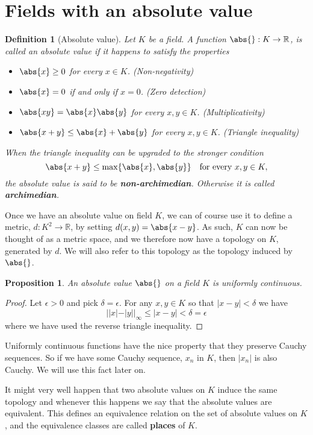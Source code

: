 \documentclass{article}
\newtheorem{definition}{Definition}[section]
\newtheorem{proposition}{Proposition}[section]
\newcommand{\mbb}[1]{\mathbb{#1}}
\begin{document}
\section{Fields with an absolute value}

\begin{definition}[Absolute value]
    Let $K$ be a field. A function $\abs{} : K \to \mbb R$, is called an absolute value if it happens to satisfy the properties
    \begin{itemize}
        \item $\abs{x} \geq 0$ for every $x \in K$. (Non-negativity)
        \item $\abs{x} = 0$ if and only if $x = 0$. (Zero detection)
        \item $\abs{xy} = \abs{x} \abs{y}$ for every $x,y \in K$. (Multiplicativity)
        \item $\abs{x + y} \leq \abs{x} + \abs{y}$ for every $x,y \in K$. (Triangle inequality)
    \end{itemize}
    When the triangle inequality can be upgraded to the stronger condition $$\abs{x + y} \leq \max \{\abs{x}, \abs{y}\} \quad \text{for every } x,y \in K,$$
    the absolute value is said to be \textbf{non-archimedian}. Otherwise it is called \textbf{archimedian}.
\end{definition}

Once we have an absolute value on field $K$, we can of course use it to define a metric, $d : K^2 \to \mbb R$, by setting $d(x,y) = \abs{x - y}$. As such, $K$ can now be thought of as a metric space, and we therefore now have a topology on $K$, generated by $d$. We will also refer to this topology as the topology induced by $\abs{}$.

\begin{proposition}
    An absolute value $\abs{}$ on a field $K$ is uniformly continuous.  
\end{proposition}
\begin{proof}
    Let $\epsilon > 0$ and pick $\delta = \epsilon$. For any $x,y \in K$ so that $|x - y| < \delta$ we have 
    $$||x| - |y||_\infty \leq |x - y| < \delta = \epsilon$$
    where we have used the reverse triangle inequality. 
\end{proof}
Uniformly continuous functions have the nice property that they preserve Cauchy sequences. So if we have some Cauchy sequence, $x_n$ in $K$, then $|x_n|$ is also Cauchy. We will use this fact later on.

It might very well happen that two absolute values on $K$ induce the same topology and whenever this happens we say that the absolute values are equivalent. This defines an equivalence relation on the set of absolute values on $K$, and the equivalence classes are called \textbf{places} of $K$. 
\end{document}
